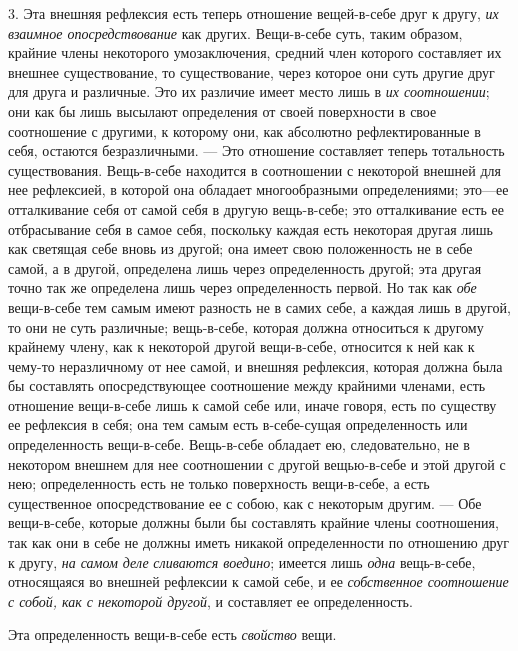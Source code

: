 3. Эта внешняя рефлексия есть теперь отношение вещей-в-себе друг к другу,
{\em их взаимное опосредствование} как других.
Вещи-в-себе суть, таким образом, крайние члены некоторого умозаключения,
средний член которого составляет их внешнее существование, то
существование, через которое они суть другие друг для друга и различные.
Это их различие имеет место лишь в {\em их
соотношении}; они как бы лишь высылают определения от своей поверхности в
свое соотношение с другими, к которому они, как абсолютно рефлектированные
в себя, остаются безразличными. — Это отношение составляет теперь
тотальность существования. Вещь-в-себе находится в соотношении с некоторой
внешней для нее рефлексией, в которой она обладает многообразными
определениями; это—ее отталкивание себя от самой себя в другую вещь-в-себе;
это отталкивание есть ее отбрасывание себя в самое себя, поскольку каждая
есть некоторая другая лишь как светящая себе вновь из другой; она имеет
свою положенность не в себе самой, а в другой, определена лишь через
определенность другой; эта другая точно так же определена лишь через
определенность первой. Но так как {\em обе} вещи-в-себе
тем самым имеют разность не в самих себе, а каждая лишь в другой, то они не
суть различные; вещь-в-себе, которая должна относиться к другому крайнему
члену, как к некоторой другой вещи-в-себе, относится к ней как к чему-то
неразличному от нее самой, и внешняя рефлексия, которая должна была бы
составлять опосредствующее соотношение между крайними членами, есть
отношение вещи-в-себе лишь к самой себе или, иначе говоря, есть по существу
ее рефлексия в себя; она тем самым есть в-себе-сущая определенность или
определенность вещи-в-себе. Вещь-в-себе обладает ею, следовательно, не в
некотором внешнем для нее соотношении с другой вещью-в-себе и этой другой с
нею; определенность есть не только поверхность вещи-в-себе, а есть
существенное опосредствование ее с собою, как с некоторым другим. — Обе
вещи-в-себе, которые должны были бы составлять крайние члены соотношения,
так как они в себе не должны иметь никакой определенности по отношению друг
к другу, {\em на самом деле
}{\em сливаются воедино}; имеется лишь
{\em одна} вещь-в-себе, относящаяся во внешней
рефлексии к самой себе, и ее {\em собственное
соотношение с собой, как с некоторой другой}, и составляет ее
определенность.

Эта определенность вещи-в-себе есть {\em свойство} вещи.

